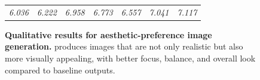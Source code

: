 \begin{figure}[!t]
{\begin{tabularx}{\textwidth}{Y Y Y Y Y Y Y}
        \\[0.3em]
        \small{\textit{6.036}} &
        \small{\textit{6.222}} &
        \small{\textit{6.958}} &
        \small{\textit{6.773}} &
        \small{\textit{6.557}} &
        \small{\textit{7.041}} &
        \small{\textit{7.117}} 
        \\[0.3em]

\end{tabularx}
\caption{\textbf{Qualitative results for aesthetic-preference image generation.} \methodname{} produces images that are not only realistic but also more visually appealing, with better focus, balance, and overall look compared to baseline outputs.
\label{fig:appen:quali_aesthetic}
}
}
\end{figure}